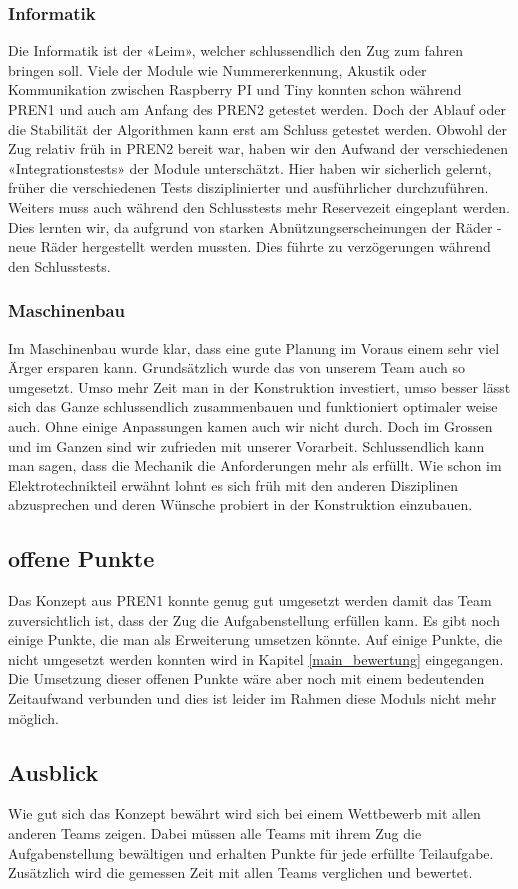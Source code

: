 \documentclass[../../main.tex]{subfiles}
\begin{document}
\subsubsection{Informatik}
Die Informatik ist der «Leim», welcher schlussendlich den Zug zum fahren bringen soll. Viele der Module wie Nummererkennung, Akustik oder Kommunikation zwischen Raspberry PI und Tiny konnten schon während PREN1 und auch am Anfang des PREN2 getestet werden. Doch der Ablauf oder die Stabilität der Algorithmen kann erst am Schluss getestet werden. Obwohl der Zug relativ früh in PREN2 bereit war, haben wir den Aufwand der verschiedenen «Integrationstests» der Module unterschätzt. Hier haben wir sicherlich gelernt, früher die verschiedenen Tests disziplinierter und ausführlicher durchzuführen.\\
Weiters muss auch während den Schlusstests mehr Reservezeit eingeplant werden. Dies lernten wir, da aufgrund von starken Abnützungserscheinungen der Räder - neue Räder hergestellt werden mussten. Dies führte zu verzögerungen während den Schlusstests.

\pagebreak

\subsubsection{Maschinenbau}
Im Maschinenbau wurde klar, dass eine gute Planung im Voraus einem sehr viel Ärger ersparen kann. Grundsätzlich wurde das von unserem Team auch so umgesetzt. Umso mehr Zeit man in der Konstruktion investiert, umso besser lässt sich das Ganze schlussendlich zusammenbauen und funktioniert optimaler weise auch. Ohne einige Anpassungen kamen auch wir nicht durch. Doch im Grossen und im Ganzen sind wir zufrieden mit unserer Vorarbeit. Schlussendlich kann man sagen, dass die Mechanik die Anforderungen mehr als erfüllt.
Wie schon im Elektrotechnikteil erwähnt lohnt es sich früh mit den anderen Disziplinen abzusprechen und deren Wünsche probiert in der Konstruktion einzubauen.



\subsection{offene Punkte}
Das Konzept aus PREN1 konnte genug gut umgesetzt werden damit das Team zuversichtlich ist, dass der Zug die Aufgabenstellung erfüllen kann. Es gibt noch einige Punkte, die man als Erweiterung umsetzen könnte. Auf einige Punkte, die nicht umgesetzt werden konnten wird in Kapitel \ref{main_bewertung} eingegangen. Die Umsetzung dieser offenen Punkte wäre aber noch mit einem bedeutenden Zeitaufwand verbunden und dies ist leider im Rahmen diese Moduls nicht mehr möglich.

\subsection{Ausblick}
Wie gut sich das Konzept bewährt wird sich bei einem Wettbewerb mit allen anderen Teams zeigen. Dabei müssen alle Teams mit ihrem Zug die Aufgabenstellung bewältigen und erhalten Punkte für jede erfüllte Teilaufgabe. Zusätzlich wird die gemessen Zeit mit allen Teams verglichen und bewertet.
\end{document}
